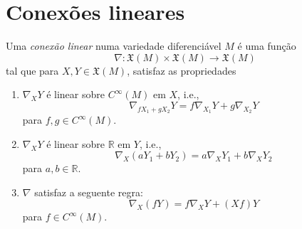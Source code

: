 %
%
%
%

\section{Conexões lineares}

\begin{definicao}
	Uma \emph{conexão linear} numa variedade diferenciável $M$ é uma função
	\begin{equation*}
		\nabla: \mathfrak{X}(M) \times \mathfrak{X}(M) \rightarrow \mathfrak{X}(M)
	\end{equation*}
	tal que para $X,Y \in \mathfrak{X}(M)$, satisfaz as propriedades
	\begin{enumerate}
		\item $\nabla_X Y$ é linear sobre $C^\infty (M)$ em $X$, i.e.,
		\begin{equation*}
			\nabla_{f X_1 + g X_2} Y = f \nabla_{X_1} Y + g \nabla_{X_2} Y
		\end{equation*}
		para $f,g \in C^{\infty} (M)$.
		
		\item $\nabla_X Y$ é linear sobre $\mathbb{R}$ em $Y$, i.e.,
		\begin{equation*}
			\nabla_X (a Y_1 + b Y_2) = a \nabla_X Y_1 + b \nabla_X Y_2
		\end{equation*}
		para $a,b \in \mathbb{R}$.
		
		\item $\nabla$ satisfaz a seguente regra:
		\begin{equation*}
			\nabla_X (f Y) = f \nabla_X Y + (X f) Y
		\end{equation*}
		para $f \in C^{\infty}(M)$.
	\end{enumerate}
\end{definicao}

